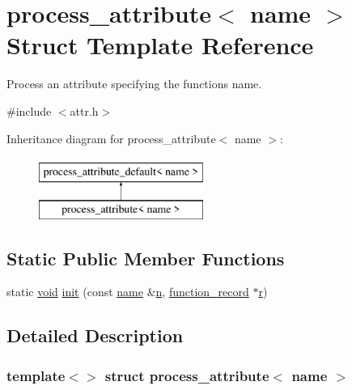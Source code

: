 \hypertarget{structprocess__attribute_3_01name_01_4}{}\section{process\+\_\+attribute$<$ name $>$ Struct Template Reference}
\label{structprocess__attribute_3_01name_01_4}


Process an attribute specifying the function\textquotesingle{}s name.  




{\ttfamily \#include $<$attr.\+h$>$}

Inheritance diagram for process\+\_\+attribute$<$ name $>$\+:\begin{figure}[H]
\begin{center}
\leavevmode
\includegraphics[height=2.000000cm]{structprocess__attribute_3_01name_01_4}
\end{center}
\end{figure}
\subsection*{Static Public Member Functions}
\begin{DoxyCompactItemize}
\item 
static \mbox{\hyperlink{_s_d_l__opengles2__gl2ext_8h_ae5d8fa23ad07c48bb609509eae494c95}{void}} \mbox{\hyperlink{structprocess__attribute_3_01name_01_4_a853a8daa0d8ef7d1980739f9785e67c1}{init}} (const \mbox{\hyperlink{structname}{name}} \&\mbox{\hyperlink{_s_d_l__opengl__glext_8h_ae2b4646468bc89d0ba646f5cf838e051}{n}}, \mbox{\hyperlink{structfunction__record}{function\+\_\+record}} $\ast$\mbox{\hyperlink{_s_d_l__opengl_8h_a42ce7cdc612e53abee15043f80220d97}{r}})
\end{DoxyCompactItemize}


\subsection{Detailed Description}
\subsubsection*{template$<$$>$\newline
struct process\+\_\+attribute$<$ name $>$}

